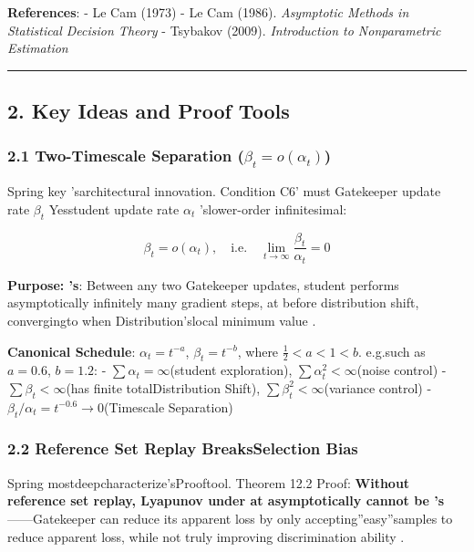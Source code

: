 \documentclass[
  12pt,
]{article}
\begin{document}
\textbf{References}: - Le Cam (1973) - Le Cam (1986). \emph{Asymptotic
Methods in Statistical Decision Theory} - Tsybakov (2009).
\emph{Introduction to Nonparametric Estimation}

\begin{center}\rule{0.5\linewidth}{0.5pt}\end{center}

\subsection{2.
Key Ideas and Proof Tools}\label{ux5173ux952eux601dux60f3ux4e0eux8bc1ux660eux5de5ux5177}

\subsubsection{\texorpdfstring{2.1 Two-Timescale Separation
(\(\beta_t = o(\alpha_t)\))}{2.1 Two-Timescale Separation (\textbackslash beta\_t = o(\textbackslash alpha\_t))}}\label{ux53ccux65f6ux95f4ux5c3aux5ea6ux5206ux79bb-beta_t-oalpha_t}

Spring key 'sarchitectural innovation. Condition C6' must  Gatekeeper update rate \(\beta_t\)
Yesstudent update rate \(\alpha_t\) 'slower-order infinitesimal:

\[\beta_t = o(\alpha_t), \quad \text{i.e.} \quad \lim_{t\to\infty} \frac{\beta_t}{\alpha_t} = 0\]

\textbf{Purpose: 's}: Between any two Gatekeeper
updates, student performs asymptotically infinitely many gradient steps, at before distribution shift, convergingto when Distribution'slocal minimum value . 

\textbf{Canonical Schedule}: \(\alpha_t = t^{-a}\), \(\beta_t = t^{-b}\), where
\(\frac{1}{2} < a < 1 < b\). e.g.such as  \(a = 0.6\), \(b = 1.2\):  -
\(\sum \alpha_t = \infty\)(student exploration), \(\sum \alpha_t^2 < \infty\)(noise control)
-
\(\sum \beta_t < \infty\)(has finite totalDistribution Shift), \(\sum \beta_t^2 < \infty\)(variance control)
- \(\beta_t / \alpha_t = t^{-0.6} \to 0\)(Timescale Separation)

\subsubsection{2.2
Reference Set Replay BreaksSelection Bias}\label{ux53c2ux8003ux96c6ux91cdux653eux6253ux7834ux9009ux62e9ux504fux5dee}

Spring mostdeepcharacterize'sProoftool. Theorem 12.2
Proof: \textbf{Without reference set replay, Lyapunov
under at asymptotically cannot be 's}------Gatekeeper
can reduce its apparent loss by only accepting''easy''samples to reduce apparent loss, while not truly improving discrimination ability . 
\end{document}
